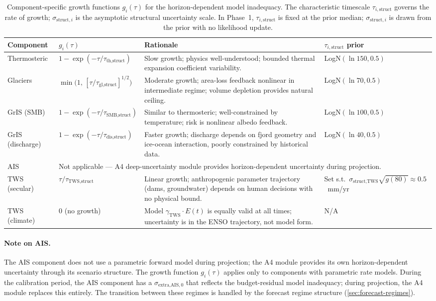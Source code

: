 \documentclass[11pt]{article}
\begin{document}
\begin{table}[ht]
\centering
\caption{Component-specific growth functions $g_i(\tau)$ for the horizon-dependent model inadequacy.  The characteristic timescale $\tau_{i,\text{struct}}$ governs the rate of growth; $\sigma_{\text{struct},i}$ is the asymptotic structural uncertainty scale.  In Phase~1, $\tau_{i,\text{struct}}$ is fixed at the prior median; $\sigma_{\text{struct},i}$ is drawn from the prior with no likelihood update.}
\label{tab:growth-functions}
\small
\begin{tabular}{lp{4.2cm}p{5.5cm}l}
\toprule
Component & $g_i(\tau)$ & Rationale & $\tau_{i,\text{struct}}$ prior \\
\midrule
Thermosteric & $1 - \exp(-\tau/\tau_{\text{th,struct}})$ & Slow growth; physics well-understood; bounded thermal expansion coefficient variability. & LogN$(\ln 150, 0.5)$ \\
\addlinespace
Glaciers & $\min\!\bigl(1,\, [\tau/\tau_{\text{gl,struct}}]^{1/2}\bigr)$ & Moderate growth; area-loss feedback nonlinear in intermediate regime; volume depletion provides natural ceiling. & LogN$(\ln 70, 0.5)$ \\
\addlinespace
GrIS (SMB) & $1 - \exp(-\tau/\tau_{\text{SMB,struct}})$ & Similar to thermosteric; well-constrained by temperature; risk is nonlinear albedo feedback. & LogN$(\ln 100, 0.5)$ \\
\addlinespace
GrIS (discharge) & $1 - \exp(-\tau/\tau_{\text{dis,struct}})$ & Faster growth; discharge depends on fjord geometry and ice-ocean interaction, poorly constrained by historical data. & LogN$(\ln 40, 0.5)$ \\
\addlinespace
AIS & \multicolumn{3}{l}{Not applicable --- A4 deep-uncertainty module provides horizon-dependent uncertainty during projection.} \\
\addlinespace
TWS (secular) & $\tau / \tau_{\text{TWS,struct}}$ & Linear growth; anthropogenic parameter trajectory (dams, groundwater) depends on human decisions with no physical bound. & Set s.t.\ $\sigma_{\text{struct,TWS}} \sqrt{g(80)} \approx 0.5$~mm/yr \\
\addlinespace
TWS (climate) & $0$ (no growth) & Model $\gamma_{\text{TWS}} \cdot E(t)$ is equally valid at all times; uncertainty is in the ENSO trajectory, not model form. & N/A \\
\bottomrule
\end{tabular}
\end{table}

\paragraph{Note on AIS.}  The AIS component does not use a parametric forward model during projection; the A4 module provides its own horizon-dependent uncertainty through its scenario structure.  The growth function $g_i(\tau)$ applies only to components with parametric rate models.  During the calibration period, the AIS component has a $\sigma_{\text{extra,AIS},0}$ that reflects the budget-residual model inadequacy; during projection, the A4 module replaces this entirely.  The transition between these regimes is handled by the forecast regime structure (\cref{sec:forecast-regimes}).
\end{document}
